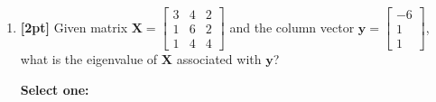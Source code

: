 \documentclass[12pt]{article}
\renewcommand{\circle}{\tikz\draw[black] (0,0) circle (1ex);}
\begin{document}
\begin{enumerate}
    
    \item \textbf{[2pt]} Given matrix $\mathbf{X}=\begin{bmatrix} 3 & 4 & 2 \\ 1 & 6 & 2 \\ 1 & 4 & 4 \end{bmatrix} $ and the column vector $\mathbf{y}=\begin{bmatrix} -6 \\ 1 \\ 1 \end{bmatrix}$, what is the eigenvalue of $\mathbf{X}$ associated with $\mathbf{y}$?

    \textbf{Select one:}



    \clearpage
\end{enumerate}
\end{document}
